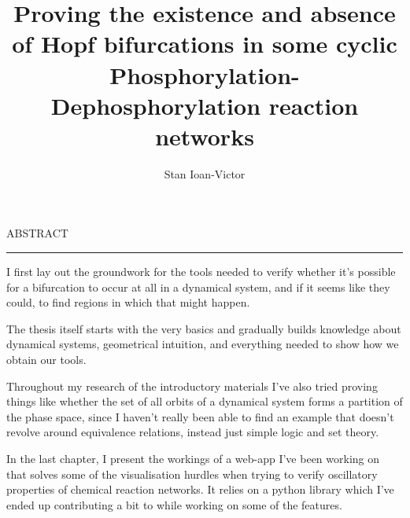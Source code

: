 \documentclass[12pt]{report}
\begin{document}
\theoremstyle{definition}
\newtheorem{theorem}{}
\newtheorem{corollary}[theorem]{Corollary}
\theoremstyle{definition}
\newtheorem{definition}{Definition}
\newtheorem{lemma}{Lemma}
\newtheorem{proposition}{Proposition}

\title{Proving the existence and absence of Hopf bifurcations in some cyclic Phosphorylation-Dephosphorylation reaction networks	}
\author{Stan Ioan-Victor}

\maketitle

\newpage
\thispagestyle{empty}
\mbox{}
\newpage
{}

\cleardoublepage
ABSTRACT
\vspace{0.5cm}
\hrule
\vspace{0.5cm}

I first lay out the groundwork for the tools needed to verify whether it's possible for a bifurcation to occur at all in a dynamical system, and if it seems like they could, to find regions in which that might happen.

The thesis itself starts with the very basics and gradually builds knowledge about dynamical systems, geometrical intuition, and everything needed to show how we obtain our tools.

Throughout my research of the introductory materials I've also tried proving things like whether the set of all orbits of a dynamical system forms a partition of the phase space, since I haven't really been able to find an example that doesn't revolve around equivalence relations, instead just simple logic and set theory.

In the last chapter, I present the workings of a web-app I've been working on that solves some of the visualisation hurdles when trying to verify oscillatory properties of chemical reaction networks. It relies on a python library which I've ended up contributing a bit to while working on some of the features.

\tableofcontents

\newpage
{}










\printbibliography
\end{document}
